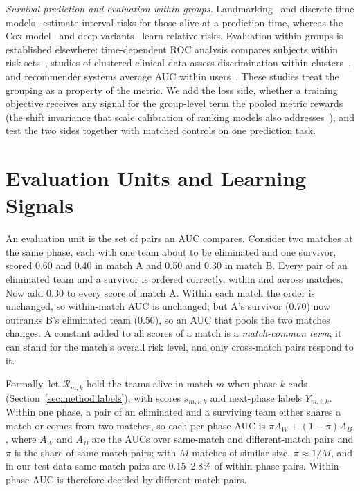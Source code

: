 \documentclass[sigconf,anonymous]{acmart}
\begin{document}
\emph{Survival prediction and evaluation within groups.} Landmarking~\cite{vanHouwelingen07} and discrete-time models~\cite{SingerWillett93,Gensheimer19} estimate interval risks for those alive at a prediction time, whereas the Cox model~\cite{Cox72} and deep variants~\cite{DeepHit18,DynamicDeepHit20} learn relative risks. Evaluation within groups is established elsewhere: time-dependent ROC analysis compares subjects within risk sets~\cite{HeagertyZheng05}, studies of clustered clinical data assess discrimination within clusters~\cite{vanKlaveren14}, and recommender systems average AUC within users~\cite{Zhou18}. These studies treat the grouping as a property of the metric. We add the loss side, whether a training objective receives any signal for the group-level term the pooled metric rewards (the shift invariance that scale calibration of ranking models also addresses~\cite{Yan22}), and test the two sides together with matched controls on one prediction task.

\section{Evaluation Units and Learning Signals}
\label{sec:account}
An evaluation unit is the set of pairs an AUC compares. Consider two matches at the same phase, each with one team about to be eliminated and one survivor, scored 0.60 and 0.40 in match A and 0.50 and 0.30 in match B. Every pair of an eliminated team and a survivor is ordered correctly, within and across matches. Now add 0.30 to every score of match A. Within each match the order is unchanged, so within-match AUC is unchanged; but A's survivor (0.70) now outranks B's eliminated team (0.50), so an AUC that pools the two matches changes. A constant added to all scores of a match is a \emph{match-common term}; it can stand for the match's overall risk level, and only cross-match pairs respond to it.

Formally, let $\mathcal{R}_{m,k}$ hold the teams alive in match $m$ when phase $k$ ends (Section~\ref{sec:method:labels}), with scores $s_{m,i,k}$ and next-phase labels $Y_{m,i,k}$. Within one phase, a pair of an eliminated and a surviving team either shares a match or comes from two matches, so each per-phase AUC is $\pi A_W+(1-\pi)A_B$, where $A_W$ and $A_B$ are the AUCs over same-match and different-match pairs and $\pi$ is the share of same-match pairs; with $M$ matches of similar size, $\pi\approx1/M$, and in our test data same-match pairs are 0.15--2.8\% of within-phase pairs. Within-phase AUC is therefore decided by different-match pairs.
\end{document}

